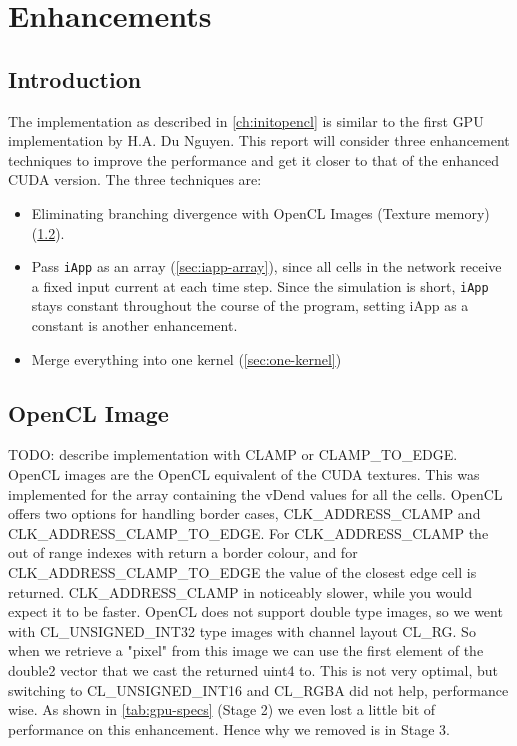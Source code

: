 \documentclass[final]{report}
\begin{document}
\chapter{Enhancements}

\section{Introduction}
The implementation as described in \cref{ch:initopencl} is similar to the first GPU implementation by H.A. Du Nguyen.
This report will consider three enhancement techniques to improve the performance and get it closer to that of the enhanced CUDA version.
The three techniques are:
\begin{itemize}
	\item Eliminating branching divergence with OpenCL Images (Texture memory) (\cref{sec:image-texture}).
	\item Pass \texttt{iApp} as an array (\cref{sec:iapp-array}), since all cells in the network receive a fixed input current at each time step. Since the simulation is short, \texttt{iApp} stays constant throughout the course of the program, setting iApp as a constant is another enhancement.
	\item Merge everything into one kernel (\cref{sec:one-kernel})
\end{itemize}

\section{OpenCL Image}\label{sec:image-texture}
TODO: describe implementation
with CLAMP or CLAMP\_TO\_EDGE.
OpenCL images are the OpenCL equivalent of the CUDA textures.
This was implemented for the array containing the vDend values for all the cells.
OpenCL offers two options for handling border cases, CLK\_ADDRESS\_CLAMP and CLK\_ADDRESS\_CLAMP\_TO\_EDGE.
For CLK\_ADDRESS\_CLAMP the out of range indexes with return a border colour, and for CLK\_ADDRESS\_CLAMP\_TO\_EDGE the value of the closest edge cell is returned.
CLK\_ADDRESS\_CLAMP in noticeably slower, while you would expect it to be faster.
OpenCL does not support double type images, so we went with CL\_UNSIGNED\_INT32 type images with channel layout CL\_RG.
So when we retrieve a "pixel" from this image we can use the first element of the double2 vector that we cast the returned uint4 to.
This is not very optimal, but switching to CL\_UNSIGNED\_INT16 and CL\_RGBA  did not help, performance wise.
As shown in \cref{tab:gpu-specs} (Stage 2) we even lost a little bit of performance on this enhancement.
Hence why we removed is in Stage 3.
\end{document}
